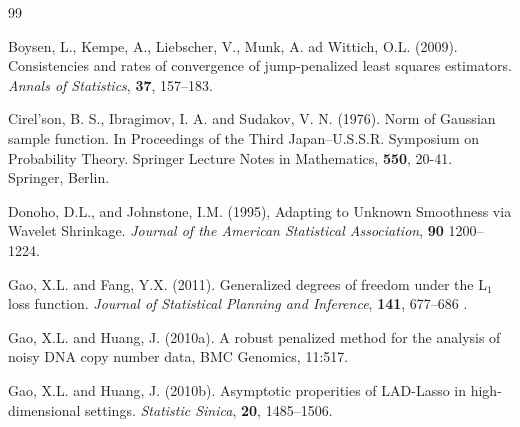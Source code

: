 \documentclass[12pt]{article}
\begin{document}
\renewcommand{\baselinestretch}{1.0}
\begin{thebibliography} {99}
 \addtolength{\itemsep}{-0.5\baselineskip}

\item Boysen, L., Kempe, A., Liebscher, V., Munk, A. ad Wittich, O.L. (2009). Consistencies
and rates of convergence of jump-penalized least squares estimators.
\emph{Annals of Statistics}, {\bf 37}, 157--183.

\item Cirel'son, B. S., Ibragimov, I. A. and Sudakov, V. N. (1976). Norm of Gaussian sample
function. In Proceedings of the Third Japan--U.S.S.R. Symposium on Probability Theory. Springer Lecture Notes in Mathematics,  \textbf{ 550},  20-41. Springer, Berlin.

\item Donoho, D.L., and Johnstone, I.M. (1995), Adapting to Unknown Smoothness via
Wavelet Shrinkage. \emph{Journal of the American Statistical Association}, {\bf 90}
1200--1224.

\item
Gao, X.L. and Fang, Y.X. (2011). Generalized degrees of freedom under
the L$_1$ loss function.  \emph{Journal of Statistical Planning and
Inference}, {\bf 141}, 677--686 .



\item Gao, X.L. and Huang, J. (2010a). A robust penalized method for the analysis of noisy DNA copy number data, BMC Genomics, 11:517.


\item
 Gao, X.L. and Huang, J. (2010b).
Asymptotic properities of LAD-Lasso in high-dimensional settings.
 \emph{Statistic Sinica}, {\bf 20}, 1485--1506.





\end{thebibliography}
\end{document}
